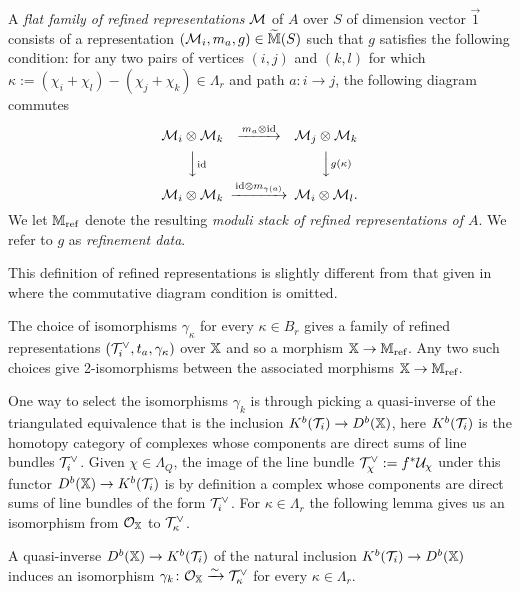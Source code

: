 \documentclass[12pt]{amsart}
\begin{document}
\begin{definition} \label{def:refined}
A {\em flat family of refined representations} $\mathcal{M}$ of $A$ over $S$ of dimension vector $\vec{1}$ consists of a representation $(\mathcal{M}_i, m_a, g) \in \widetilde{\mathbb{M}}(S)$ such that $g$ satisfies the following condition: for any two pairs of vertices $(i,j)$ and $(k,l)$ for which $\kappa:= (\chi_i + \chi_l)-(\chi_j + \chi_k) \in \Lambda_r$ and path $a \colon i \rightarrow j$, the following diagram commutes
\begin{equation}  \label{eq:refined}
\begin{CD}
\cM_i \otimes \cM_k @>m_a \otimes \text{id}>> \cM_j \otimes \cM_k\\
@VV\text{id}V @VVg(\kappa)V\\
\cM_i \otimes \cM_k @>\text{id} \otimes m_{\gamma(a)}>> \cM_i \otimes \cM_l.
\end{CD}
\end{equation}
We let $\mathbb{M}_{\text{ref}}$ denote the resulting {\em moduli stack of refined representations of $A$}. We refer to $g$ as {\em refinement data}.
\end{definition}

\begin{remark}
This definition of refined representations is slightly different from that given in \cite[Definition 3.2]{Abd} where the commutative diagram condition is omitted.
\end{remark}

The choice of isomorphisms $\gamma_\kappa$ for every $\kappa \in B_r$ gives a family of refined representations $(\mathcal{T}_i^\vee, t_a, \gamma_\kappa)$ over $\mathbb{X}$ and so a morphism $\mathbb{X} \rightarrow \mathbb{M}_\text{ref}$.
Any two such choices give 2-isomorphisms between the associated morphisms $\mathbb{X} \rightarrow \mathbb{M}_\text{ref}$.

One way to select the isomorphisms $\gamma_k$ is through picking a quasi-inverse of the triangulated equivalence that is the inclusion $K^b(\mathcal{T}_i) \rightarrow D^b(\mathbb{X})$, here $K^b(\mathcal{T}_i)$ is the homotopy category of complexes whose components are direct sums of line bundles $\mathcal{T}_i^\vee$.
Given $\chi \in \Lambda_{Q}$, the image of the line bundle $\mathcal{T}_\chi^\vee:= f^* \mathcal{U}_\chi$ under this functor $D^b(\mathbb{X}) \rightarrow K^b(\mathcal{T}_i)$ is by definition a complex whose components are direct sums of line bundles of the form $\mathcal{T}_i^\vee$.
For $\kappa \in \Lambda_r$ the following lemma gives us an isomorphism from $\mathcal{O}_{\mathbb{X}}$ to $\mathcal{T}_\kappa^\vee$.

\begin{lemma}\label{lm:kappa0}
A quasi-inverse $D^b(\mathbb{X}) \rightarrow K^b(\mathcal{T}_i)$ of the natural inclusion $K^b(\mathcal{T}_i) \rightarrow D^b(\mathbb{X})$ induces an isomorphism $\gamma_k\colon \mathcal{O}_{\mathbb{X}} \xrightarrow{\sim}\mathcal{T}_\kappa^\vee$ for every  $\kappa \in \Lambda_r$.
\end{lemma}
\end{document}
